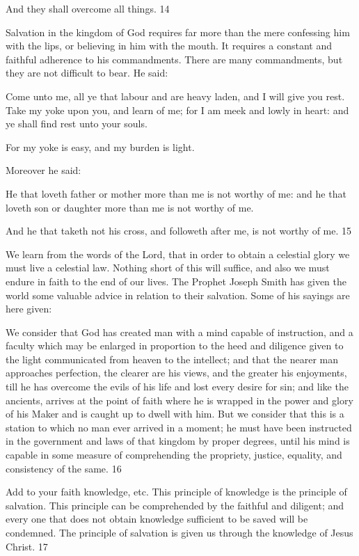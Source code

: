 And they shall overcome all things. 14

Salvation in the kingdom of God requires far more than the mere confessing him with the
lips, or believing in him with the mouth. It requires a constant and faithful adherence to his
commandments. There are many commandments, but they are not difficult to bear. He said:

Come unto me, all ye that labour and are heavy laden, and I will give you rest. Take my yoke
upon you, and learn of me; for I am meek and lowly in heart: and ye shall find rest unto your
souls.

For my yoke is easy, and my burden is light.

Moreover he said:

He that loveth father or mother more than me is not worthy of me: and he that loveth son or
daughter more than me is not worthy of me.

And he that taketh not his cross, and followeth after me, is not worthy of me. 15

We learn from the words of the Lord, that in order to obtain a celestial glory we must live a
celestial law. Nothing short of this will suffice, and also we must endure in faith to the end of
our lives. The Prophet Joseph Smith has given the world some valuable advice in relation to
their salvation. Some of his sayings are here given:

We consider that God has created man with a mind capable of instruction, and a faculty
which may be enlarged in proportion to the heed and diligence given to the light
communicated from heaven to the intellect; and that the nearer man approaches perfection,
the clearer are his views, and the greater his enjoyments, till he has overcome the evils of his
life and lost every desire for sin; and like the ancients, arrives at the point of faith where he is
wrapped in the power and glory of his Maker and is caught up to dwell with him. But we
consider that this is a station to which no man ever arrived in a moment; he must have been
instructed in the government and laws of that kingdom by proper degrees, until his mind is
capable in some measure of comprehending the propriety, justice, equality, and consistency
of the same. 16

Add to your faith knowledge, etc. This principle of knowledge is the principle of salvation.
This principle can be comprehended by the faithful and diligent; and every one that does not
obtain knowledge sufficient to be saved will be condemned. The principle of salvation is
given us through the knowledge of Jesus Christ. 17

